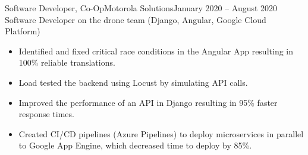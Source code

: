 \begin{cvsubsection}{Software Developer, Co-Op}{Motorola Solutions}{January 2020 -- August 2020}
	Software Developer on the drone team (Django, Angular, Google Cloud Platform)			
	\begin{itemize}
		\item Identified and fixed critical race conditions in the Angular App resulting in 100\% reliable translations.
		\item Load tested the backend using Locust by simulating API calls.
		\item Improved the performance of an API in Django resulting in 95\% faster response times.
		\item Created CI/CD pipelines (Azure Pipelines) to deploy microservices in parallel to Google App Engine, which decreased time to deploy by 85\%.
	\end{itemize}
\end{cvsubsection}